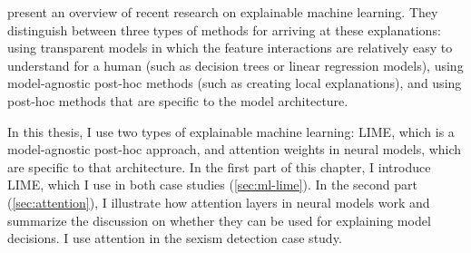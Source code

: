 \label{chap:xml}

\citet{barredo-arrieta2020explainable} present an overview of recent research on explainable machine learning.
They distinguish between three types of methods for arriving at these explanations: using transparent models in which the feature interactions are relatively easy to understand for a human (such as decision trees or linear regression models), using model-agnostic post-hoc methods (such as creating local explanations), and using post-hoc methods that are specific to the model architecture.

In this thesis, I use two types of explainable machine learning: 
LIME, which is a model-agnostic post-hoc approach, and attention weights in neural models, which are specific to that architecture.
In the first part of this chapter, I introduce LIME, which I use in both case studies (\autoref{sec:ml-lime}).
In the second part (\autoref{sec:attention}), I illustrate how attention layers in neural models work and summarize the discussion on whether they can be used for explaining model decisions.
I use attention in the sexism detection case study.


